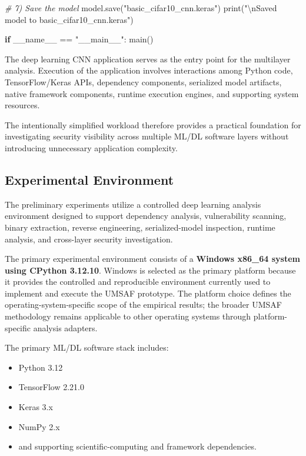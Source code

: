 \documentclass[
  12pt,
  letterpaper,
  oneside]{report}
\newenvironment{Shaded}{}{}
\newcommand{\BuiltInTok}[1]{\textcolor[rgb]{0.00,0.50,0.00}{#1}}
\newcommand{\CharTok}[1]{\textcolor[rgb]{0.25,0.44,0.63}{#1}}
\newcommand{\CommentTok}[1]{\textcolor[rgb]{0.38,0.63,0.69}{\textit{#1}}}
\newcommand{\ControlFlowTok}[1]{\textcolor[rgb]{0.00,0.44,0.13}{\textbf{#1}}}
\newcommand{\NormalTok}[1]{#1}
\newcommand{\OperatorTok}[1]{\textcolor[rgb]{0.40,0.40,0.40}{#1}}
\newcommand{\StringTok}[1]{\textcolor[rgb]{0.25,0.44,0.63}{#1}}
\newcommand{\VariableTok}[1]{\textcolor[rgb]{0.10,0.09,0.49}{#1}}
\providecommand{\tightlist}{%
  \setlength{\itemsep}{0pt}\setlength{\parskip}{0pt}}
\begin{document}
\begin{Shaded}
\begin{Highlighting}[]
    \CommentTok{\# 7) Save the model}
\NormalTok{    model.save(}\StringTok{"basic\_cifar10\_cnn.keras"}\NormalTok{)}
    \BuiltInTok{print}\NormalTok{(}\StringTok{"}\CharTok{\textbackslash{}n}\StringTok{Saved model to basic\_cifar10\_cnn.keras"}\NormalTok{)}

\ControlFlowTok{if} \VariableTok{\_\_name\_\_} \OperatorTok{==} \StringTok{"\_\_main\_\_"}\NormalTok{:}
\NormalTok{    main()}
\end{Highlighting}
\end{Shaded}

The deep learning CNN application serves as the entry point for the
multilayer analysis. Execution of the application involves interactions
among Python code, TensorFlow/Keras APIs, dependency components,
serialized model artifacts, native framework components, runtime
execution engines, and supporting system resources.

The intentionally simplified workload therefore provides a practical
foundation for investigating security visibility across multiple ML/DL
software layers without introducing unnecessary application complexity.

\subsection{Experimental Environment}\label{921-experimental-environment}

The preliminary experiments utilize a controlled deep learning analysis
environment designed to support dependency analysis, vulnerability
scanning, binary extraction, reverse engineering, serialized-model
inspection, runtime analysis, and cross-layer security investigation.

The primary experimental environment consists of a \textbf{Windows
x86\_64 system using CPython 3.12.10}. Windows is selected as the
primary platform because it provides the controlled and reproducible
environment currently used to implement and execute the UMSAF prototype.
The platform choice defines the operating-system-specific scope of the
empirical results; the broader UMSAF methodology remains applicable to
other operating systems through platform-specific analysis adapters.

The primary ML/DL software stack includes:

\begin{itemize}
\tightlist
\item
  Python 3.12
\item
  TensorFlow 2.21.0
\item
  Keras 3.x
\item
  NumPy 2.x
\item
  and supporting scientific-computing and framework dependencies.
\end{itemize}
\end{document}

